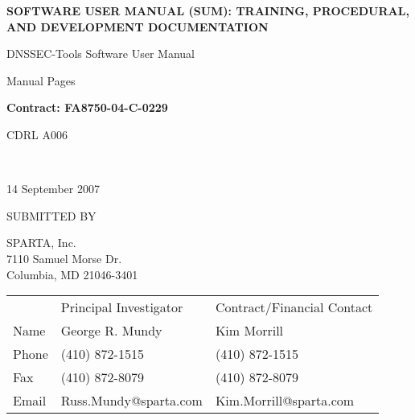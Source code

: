 \documentclass[12pt]{article}
\begin{document}

\begin{titlepage}

\vspace{.5in}

\begin{center}
\LARGE{\bf
SOFTWARE USER MANUAL (SUM):
TRAINING, PROCEDURAL, AND
DEVELOPMENT DOCUMENTATION
}
\vspace{1in}

\Large{
DNSSEC-Tools Software User Manual

Manual Pages
\vspace{0.5in}

{\bf Contract: FA8750-04-C-0229
\vspace{0.125in}

CDRL A006}\\
}
14 September 2007
\end{center}

\vspace{.5in}

SUBMITTED BY

SPARTA, Inc.\\
7110 Samuel Morse Dr.\\
Columbia, MD 21046-3401
\vspace{0.25in}

\begin{table}[hb]
\begin{tabular}{lll}
	& Principal Investigator	& Contract/Financial Contact\\
Name	& George R. Mundy		& Kim Morrill\\
Phone	& (410) 872-1515		& (410) 872-1515\\
Fax	& (410) 872-8079		& (410) 872-8079\\
Email	& Russ.Mundy@sparta.com		& Kim.Morrill@sparta.com\\
\end{tabular}
\end{table}

\end{titlepage}


\end{document}
